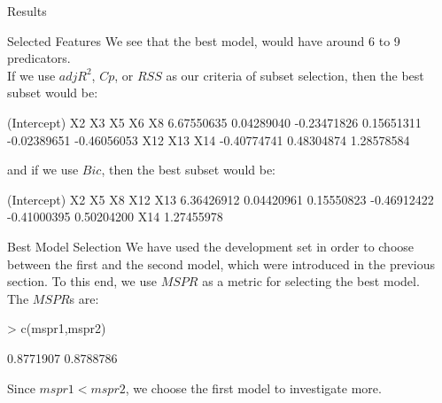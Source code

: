 \documentclass[a4paper,11pt]{article}
\begin{document}
\begin{section}{Results}
\begin{subsection}{Selected Features}
We see that the best model, would have around 6 to 9 predicators.\\
If we use $adjR^2$, $Cp$, or $RSS$ as our criteria of subset selection, then the best subset would be:
\begin{Schunk}
\begin{Soutput}
(Intercept)          X2          X3          X5          X6          X8 
 6.67550635  0.04289040 -0.23471826  0.15651311 -0.02389651 -0.46056053 
        X12         X13         X14 
-0.40774741  0.48304874  1.28578584 
\end{Soutput}
\end{Schunk}
and if we use $Bic$, then the best subset would be:
\begin{Schunk}
\begin{Soutput}
(Intercept)          X2          X5          X8         X12         X13 
 6.36426912  0.04420961  0.15550823 -0.46912422 -0.41000395  0.50204200 
        X14 
 1.27455978 
\end{Soutput}
\end{Schunk}
\end{subsection}

\begin{subsection}{Best Model Selection}
We have used the development set in order to choose between the first and the second model, which were introduced in the previous section. To this end, we use $MSPR$ as a metric for selecting the best model.\\
The $MSPR$s are:
\begin{Schunk}
\begin{Sinput}
>   c(mspr1,mspr2)
\end{Sinput}
\begin{Soutput}
[1] 0.8771907 0.8788786
\end{Soutput}
\end{Schunk}
Since $mspr1 < mspr2$, we choose the first model to investigate more.
\end{subsection}


\end{section}
\end{document}
